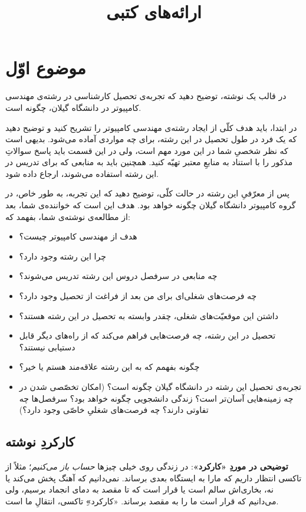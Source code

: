 \documentclass{article}
\begin{document}
\title{ارائه‌های کتبی}
\maketitle
\section{موضوع اوّل}
در قالب یک نوشته، توضیح دهید که تجربه‌ی تحصیل کارشناسی در رشته‌ی مهندسی کامپیوتر در دانشگاه گیلان، چگونه است.

در ابتدا، باید هدف کلّی از ایجاد رشته‌ی مهندسی کامپیوتر را تشریح کنید و توضیح دهید که یک فرد در طول تحصیل در این رشته، برای چه مواردی آماده می‌شود. بدیهی است که نظر شخصیِ شما در این مورد مهم است، ولی در این قسمت باید پاسخ سوالاتِ مذکور را با استناد به منابعِ معتبر تهیّه کنید. همچنین باید به منابعی که برای تدریس در این رشته استفاده می‌شوند، ارجاع داده شود.

پس از معرّفیِ این رشته در حالت کلّی، توضیح دهید که این تجربه، به طور خاص، در گروه کامپیوتر دانشگاه گیلان چگونه خواهد بود. هدف این است که خواننده‌ی شما، بعد از مطالعه‌ی نوشته‌ی شما، بفهمد که:
\begin{itemize}
	\item هدف از مهندسی کامپیوتر چیست؟
	\item چرا این رشته وجود دارد؟
	\item چه منابعی در سرفصل دروس این رشته تدریس می‌شوند؟
	\item چه فرصت‌های شغلی‌ای برای من بعد از فراغت از تحصیل وجود دارد؟
	\item داشتن این موقعیّت‌های شغلی، چقدر وابسته به تحصیل در این رشته هستند؟
	\item تحصیل در این رشته، چه فرصت‌هایی فراهم می‌کند که از راه‌های دیگر قابل دستیابی نیستند؟
	\item چگونه بفهمم که به این رشته علاقه‌مند هستم یا خیر؟
	\item تجربه‌ی تحصیل این رشته در دانشگاه گیلان چگونه است؟ (امکان تخصّصی شدن در چه زمینه‌هایی آسان‌تر است؟ زندگی دانشجویی چگونه خواهد بود؟ سرفصل‌ها چه تفاوتی دارند؟ چه فرصت‌های شغلیِ خاصّی وجود دارد؟)
\end{itemize}
\subsection{کارکردِ نوشته}
\label{sec:function}
\textbf{توضیحی در موردِ «کارکرد»}:
در زندگی روی خیلی چیزها \emph{حساب باز می‌کنیم}؛ مثلاً از تاکسی انتظار داریم که مارا به ایستگاه بعدی برساند. نمی‌دانیم که آهنگ پخش می‌کند یا نه، بخاری‌اش سالم است یا قرار است که تا مقصد به دمای انجماد برسیم، ولی می‌دانیم که قرار است ما را به مقصد برساند. «کارکرد»ِ تاکسی، انتقالِ ما است.
\end{document}
